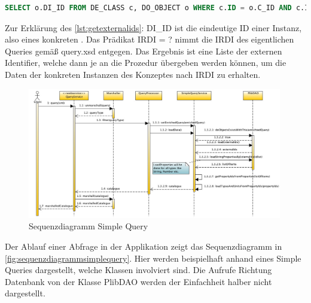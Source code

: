 \begin{lstlisting}[caption=SQL Query - Externe IDs abfragen, language=SQL, label=lst:getexternalids]
SELECT o.DI_ID FROM DE_CLASS c, DO_OBJECT o WHERE c.ID = o.C_ID AND c.IRDI = ?
\end{lstlisting}

Zur Erklärung des \autoref{lst:getexternalids}:
DI\_ID ist die eindeutige ID einer Instanz, also eines konkreten . Das Prädikat \gls{IRDI} = ? nimmt die \gls{IRDI} des eigentlichen Queries gemäß query.xsd entgegen. Das Ergebnis ist eine Liste der externen Identifier, welche dann je an die Prozedur übergeben werden können, um die Daten der konkreten Instanzen des Konzeptes nach \gls{IRDI} zu erhalten. 

\begin{figure}[htbp]
	\centering
		\includegraphics[width=0.99\textwidth]{images/plib_simple_query_sequence_diagram.jpg}
		\caption{Sequenzdiagramm Simple Query}
	\label{fig:sequenzdiagrammsimplequery}
\end{figure}

Der Ablauf einer Abfrage in der Applikation zeigt das Sequenzdiagramm in \autoref{fig:sequenzdiagrammsimplequery}. Hier werden beispielhaft anhand eines Simple Queries dargestellt, welche Klassen involviert sind. Die Aufrufe Richtung Datenbank von der Klasse PlibDAO werden der Einfachheit halber nicht dargestellt. 

